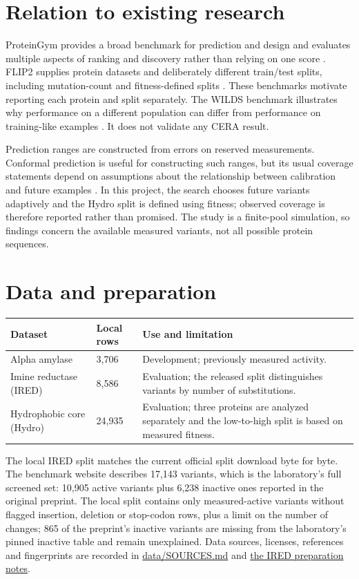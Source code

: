 \documentclass[11pt,a4paper]{article}
\begin{document}
\section{Relation to existing research}
ProteinGym provides a broad benchmark for prediction and design and evaluates multiple aspects of ranking and discovery rather than relying on one score \cite{proteingym}. FLIP2 supplies protein datasets and deliberately different train/test splits, including mutation-count and fitness-defined splits \cite{flip2}. These benchmarks motivate reporting each protein and split separately. The WILDS benchmark illustrates why performance on a different population can differ from performance on training-like examples \cite{wilds}. It does not validate any CERA result.

Prediction ranges are constructed from errors on reserved measurements. Conformal prediction is useful for constructing such ranges, but its usual coverage statements depend on assumptions about the relationship between calibration and future examples \cite{conformal}. In this project, the search chooses future variants adaptively and the Hydro split is defined using fitness; observed coverage is therefore reported rather than promised. The study is a finite-pool simulation, so findings concern the available measured variants, not all possible protein sequences.

\section{Data and preparation}
\begin{center}
\begin{tabular}{@{}p{3.1cm}p{1.8cm}p{7.4cm}@{}}
\toprule
Dataset & Local rows & Use and limitation \\
\midrule
Alpha amylase & 3,706 & Development; previously measured activity. \\
Imine reductase (IRED) & 8,586 & Evaluation; the released split distinguishes variants by number of substitutions. \\
Hydrophobic core (Hydro) & 24,935 & Evaluation; three proteins are analyzed separately and the low-to-high split is based on measured fitness. \\
\bottomrule
\end{tabular}
\end{center}
The local IRED split matches the current official split download byte for byte. The benchmark website describes 17,143 variants, which is the laboratory's full screened set: 10,905 active variants plus 6,238 inactive ones reported in the original preprint. The local split contains only measured-active variants without flagged insertion, deletion or stop-codon rows, plus a limit on the number of changes; 865 of the preprint's inactive variants are missing from the laboratory's pinned inactive table and remain unexplained. Data sources, licenses, references and fingerprints are recorded in \href{../data/SOURCES.md}{data/SOURCES.md} and \href{../docs/data/ired_preparation.md}{the IRED preparation notes}.
\end{document}
